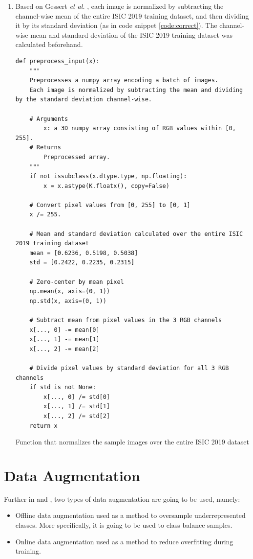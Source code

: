 \begin{enumerate}
    \item Based on Gessert \textit{et al.} \cite{gessert2018}, each image is normalized by subtracting the channel-wise mean of the entire \ac{ISIC} 2019 training dataset, and then dividing it by its standard deviation (as in code snippet \ref{code:correct}). The channel-wise mean and standard deviation of the \ac{ISIC} 2019 training dataset was calculated beforehand. \par
    
        \begin{listing}[ht]
        \begin{verbatim}
def preprocess_input(x):
    """
    Preprocesses a numpy array encoding a batch of images. 
    Each image is normalized by subtracting the mean and dividing by the standard deviation channel-wise.
    
    # Arguments
        x: a 3D numpy array consisting of RGB values within [0, 255].
    # Returns
        Preprocessed array.
    """
    if not issubclass(x.dtype.type, np.floating):
        x = x.astype(K.floatx(), copy=False)
    
    # Convert pixel values from [0, 255] to [0, 1] 
    x /= 255.
    
    # Mean and standard deviation calculated over the entire ISIC 2019 training dataset
    mean = [0.6236, 0.5198, 0.5038]
    std = [0.2422, 0.2235, 0.2315]
    
    # Zero-center by mean pixel
    np.mean(x, axis=(0, 1))
    np.std(x, axis=(0, 1))
    
    # Subtract mean from pixel values in the 3 RGB channels
    x[..., 0] -= mean[0]
    x[..., 1] -= mean[1]
    x[..., 2] -= mean[2]
    
    # Divide pixel values by standard deviation for all 3 RGB channels
    if std is not None:
        x[..., 0] /= std[0]
        x[..., 1] /= std[1]
        x[..., 2] /= std[2]
    return x
        \end{verbatim}
        \caption{Function that normalizes the sample images over the entire ISIC 2019 dataset}
        \label{code:correct}
        \end{listing}
    \end{enumerate}


\section{Data Augmentation}
\label{section:augmentation}
     Further in  and , two types of data augmentation are going to be used, namely:
     \begin{itemize}
         \item Offline data augmentation used as a method to oversample underrepresented classes. More specifically, it is going to be used to class balance samples.
         \item Online data augmentation used as a method to reduce overfitting during training.
     \end{itemize}
     
